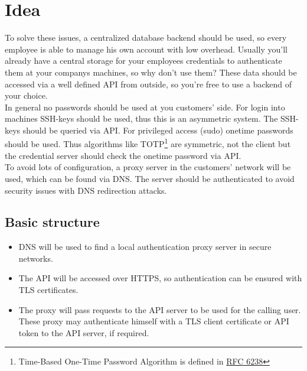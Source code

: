 %
%
%
%
%
%
%


\section{Idea}

To solve these issues, a centralized database backend should be used, so every
employee is able to manage his own account with low overhead. Usually you'll
already have a central storage for your employees credentials to authenticate
them at your companys machines, so why don't use them? These data should be
accessed via a well defined API from outside, so you're free to use a backend of
your choice. \\

In general no passwords should be used at you customers' side. For login into
machines SSH-keys should be used, thus this is an asymmetric system. The
SSH-keys should be queried via API. For privileged access (sudo) onetime
passwords should be used. Thus algorithms like TOTP\footnote{Time-Based One-Time
Password Algorithm is defined in
\href{https://tools.ietf.org/html/rfc6238}{RFC 6238}} are symmetric, not the
client but the credential server should check the onetime password via API. \\

To avoid lots of configuration, a proxy server in the customers' network will be
used, which can be found via DNS. The server should be authenticated to avoid
security issues with DNS redirection attacks.


\subsection{Basic structure}

\begin{itemize}
	\item DNS will be used to find a local authentication proxy server in secure
		networks.
	\item The API will be accessed over HTTPS, so authentication can be
		ensured with TLS certificates.
	\item The proxy will pass requests to the API server to be used for the
		calling user. These proxy may authenticate himself with a TLS client
		certificate or API token to the API server, if required.
\end{itemize}


